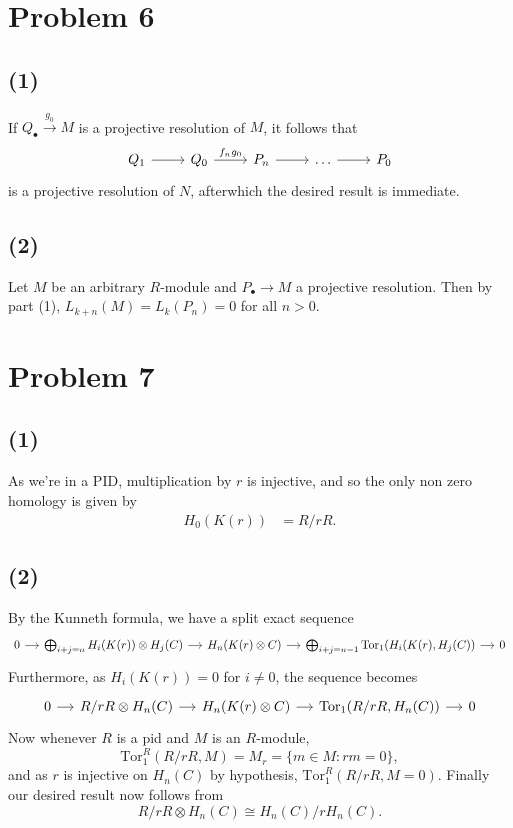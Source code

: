 \documentclass{article}
\theoremstyle{definition}
\newcommand{\Tor}{\text{Tor}}
\begin{document}
\section*{Problem 6}
\subsection*{(1)}

If $Q_{\bullet} \xrightarrow{g_0} M$ is a projective resolution of $M$,
it follows that
\[
	\begin{tikzcd}
		Q_1
		\ar{r}
		& Q_0
		\ar{r}{f_n g_0}
		& P_n
		\ar{r}
		& \ldots
		\ar{r}
		& P_0
	\end{tikzcd}
\] 
is a projective resolution of $N$, afterwhich the desired result is immediate.

\subsection*{(2)}

Let $M$ be an arbitrary $R$-module and $P_{\bullet} \to M$ a projective
resolution. Then by part (1), $L_{k + n}(M) = L_{k}(P_n) = 0$ for all $n > 0$.

\section*{Problem 7}

\subsection*{(1)}

As we're in a PID, multiplication by $r$ is injective, and so the 
only non zero homology is given by
\begin{align*}
	H_0(K(r)) &= R/rR.
\end{align*} 

\subsection*{(2)}

By the Kunneth formula, we have a split exact sequence 
\[
\begin{tikzcd}[column sep = small]
	0
	\ar{r}
	& \bigoplus_{i + j = n} H_i(K(r)) \otimes H_j(C)
	\ar{r}
	& H_n(K(r) \otimes C)
	\ar{r}
	& \bigoplus_{i + j = n - 1} \Tor_{1}(H_i(K(r), H_j(C))
	\ar{r}
	& 0
\end{tikzcd}
\] 
Furthermore, as $H_i(K(r)) = 0$ for $i \not = 0$, the sequence becomes
\[
\begin{tikzcd}[column sep = small]
	0
	\ar{r}
	& 
	R/rR \otimes H_n(C)
	\ar{r}
	& H_n(K(r) \otimes C)
	\ar{r}
	& 
	\Tor_{1}(R/rR, H_n(C))
	\ar{r}
	& 0
\end{tikzcd}
\]
Now whenever $R$ is a pid and $M$ is an $R$-module,
\[
	\Tor_1^{R}(R/rR, M)
	=
	M_r
	=
	\{m \in M : rm = 0\},
\] 
and as $r$ is injective on $H_n(C)$ by hypothesis, $\Tor_1^{R}(R/rR, M = 0)$.
Finally our desired result now follows from
\[
	R/rR \otimes H_n(C)
	\cong
	H_n(C)/rH_n(C).
\] 
\end{document}
